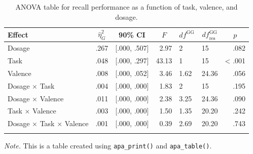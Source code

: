 \documentclass[
  ,man,floatsintext]{apa6}
\newenvironment{Shaded}{\begin{snugshade}}{\end{snugshade}}
\newcommand{\AttributeTok}[1]{\textcolor[rgb]{0.77,0.63,0.00}{#1}}
\newcommand{\DecValTok}[1]{\textcolor[rgb]{0.00,0.00,0.81}{#1}}
\newcommand{\FunctionTok}[1]{\textcolor[rgb]{0.00,0.00,0.00}{#1}}
\newcommand{\NormalTok}[1]{#1}
\newcommand{\SpecialCharTok}[1]{\textcolor[rgb]{0.00,0.00,0.00}{#1}}
\newcommand{\StringTok}[1]{\textcolor[rgb]{0.31,0.60,0.02}{#1}}
\begin{document}
\begin{table}[tbp]

\begin{center}
\begin{threeparttable}

\caption{\label{tab:anova-table}ANOVA table for recall performance as a function of task, valence, and dosage.}

\begin{tabular}{lrcrllr}
\toprule
Effect & \multicolumn{1}{c}{$\hat{\eta}^2_G$} & \multicolumn{1}{c}{90\% CI} & \multicolumn{1}{c}{$F$} & \multicolumn{1}{c}{$\mathit{df}^{\mathrm{GG}}$} & \multicolumn{1}{c}{$\mathit{df}_{\mathrm{res}}^{\mathrm{GG}}$} & \multicolumn{1}{c}{$p$}\\
\midrule
Dosage & .267 & {}[.000, .507] & 2.97 & 2 & 15 & .082\\
Task & .048 & {}[.000, .297] & 43.13 & 1 & 15 & < .001\\
Valence & .008 & {}[.000, .052] & 3.46 & 1.62 & 24.36 & .056\\ \midrule
Dosage $\times$ Task & .004 & {}[.000, .000] & 1.83 & 2 & 15 & .195\\
Dosage $\times$ Valence & .011 & {}[.000, .000] & 2.38 & 3.25 & 24.36 & .090\\
Task $\times$ Valence & .003 & {}[.000, .000] & 1.50 & 1.35 & 20.20 & .242\\ \midrule
Dosage $\times$ Task $\times$ Valence & .001 & {}[.000, .000] & 0.39 & 2.69 & 20.20 & .743\\
\bottomrule
\addlinespace
\end{tabular}

\begin{tablenotes}[para]
\normalsize{\textit{Note.} This is a table created using \texttt{apa\_print()} and \texttt{apa\_table()}.}
\end{tablenotes}

\end{threeparttable}
\end{center}

\end{table}

\begin{Shaded}
\end{Shaded}
\end{document}
